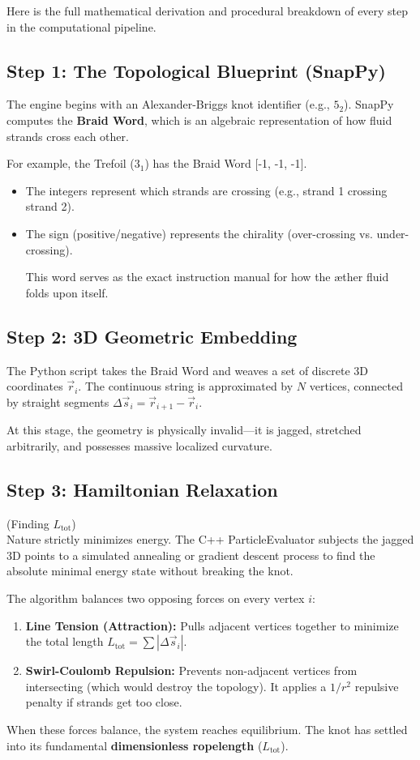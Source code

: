 \documentclass[11pt]{article}
\begin{document}
Here is the full mathematical derivation and procedural breakdown of every step in the computational pipeline.

\subsection*{Step 1: The Topological Blueprint (SnapPy)}
The engine begins with an Alexander-Briggs knot identifier (e.g., $5_2$). SnapPy computes the \textbf{Braid Word}, which is an algebraic representation of how fluid strands cross each other.

For example, the Trefoil ($3_1$) has the Braid Word [-1, -1, -1].

\begin{itemize}
\item The integers represent which strands are crossing (e.g., strand 1 crossing strand 2).


\item The sign (positive/negative) represents the chirality (over-crossing vs. under-crossing).

This word serves as the exact instruction manual for how the æther fluid folds upon itself.


\end{itemize}
\subsection*{Step 2: 3D Geometric Embedding}
The Python script takes the Braid Word and weaves a set of discrete 3D coordinates $\vec{r}_i$. The continuous string is approximated by $N$ vertices, connected by straight segments $\Delta \vec{s}_i = \vec{r}_{i+1} - \vec{r}_i$.

At this stage, the geometry is physically invalid—it is jagged, stretched arbitrarily, and possesses massive localized curvature.

\subsection*{Step 3: Hamiltonian Relaxation }(Finding $L_{\text{tot}}$)\\
Nature strictly minimizes energy. The C++ ParticleEvaluator subjects the jagged 3D points to a simulated annealing or gradient descent process to find the absolute minimal energy state without breaking the knot.

The algorithm balances two opposing forces on every vertex $i$:

\begin{enumerate}
\item \textbf{Line Tension (Attraction):} Pulls adjacent vertices together to minimize the total length $L_{\text{tot}} = \sum |\Delta \vec{s}_i|$.


\item \textbf{Swirl-Coulomb Repulsion:} Prevents non-adjacent vertices from intersecting (which would destroy the topology). It applies a $1/r^2$ repulsive penalty if strands get too close.


\end{enumerate}
When these forces balance, the system reaches equilibrium. The knot has settled into its fundamental \textbf{dimensionless ropelength} ($L_{\text{tot}}$).
\end{document}
